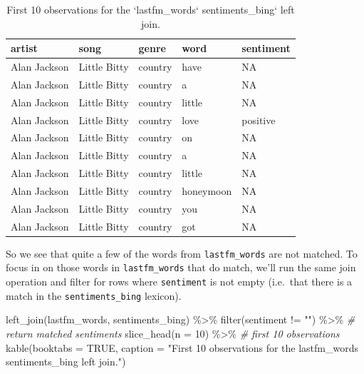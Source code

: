 \documentclass[
]{article}
\newenvironment{Shaded}{\begin{snugshade}}{\end{snugshade}}
\newcommand{\AttributeTok}[1]{\textcolor[rgb]{0.77,0.63,0.00}{#1}}
\newcommand{\CommentTok}[1]{\textcolor[rgb]{0.56,0.35,0.01}{\textit{#1}}}
\newcommand{\ConstantTok}[1]{\textcolor[rgb]{0.00,0.00,0.00}{#1}}
\newcommand{\DecValTok}[1]{\textcolor[rgb]{0.00,0.00,0.81}{#1}}
\newcommand{\FunctionTok}[1]{\textcolor[rgb]{0.00,0.00,0.00}{#1}}
\newcommand{\NormalTok}[1]{#1}
\newcommand{\SpecialCharTok}[1]{\textcolor[rgb]{0.00,0.00,0.00}{#1}}
\newcommand{\StringTok}[1]{\textcolor[rgb]{0.31,0.60,0.02}{#1}}
\begin{document}
\begin{table}

\caption{\label{tab:td-lastfm-words-bing-left-joing}First 10 observations for the `lastfm_words` sentiments_bing` left join.}
\centering
\begin{tabular}[t]{lllll}
\toprule
artist & song & genre & word & sentiment\\
\midrule
Alan Jackson & Little Bitty & country & have & NA\\
Alan Jackson & Little Bitty & country & a & NA\\
Alan Jackson & Little Bitty & country & little & NA\\
Alan Jackson & Little Bitty & country & love & positive\\
Alan Jackson & Little Bitty & country & on & NA\\
\addlinespace
Alan Jackson & Little Bitty & country & a & NA\\
Alan Jackson & Little Bitty & country & little & NA\\
Alan Jackson & Little Bitty & country & honeymoon & NA\\
Alan Jackson & Little Bitty & country & you & NA\\
Alan Jackson & Little Bitty & country & got & NA\\
\bottomrule
\end{tabular}
\end{table}

So we see that quite a few of the words from \texttt{lastfm\_words} are not matched. To focus in on those words in \texttt{lastfm\_words} that do match, we'll run the same join operation and filter for rows where \texttt{sentiment} is not empty (i.e.~that there is a match in the \texttt{sentiments\_bing} lexicon).

\begin{Shaded}
\begin{Highlighting}[]
\FunctionTok{left\_join}\NormalTok{(lastfm\_words, sentiments\_bing) }\SpecialCharTok{\%\textgreater{}\%}
  \FunctionTok{filter}\NormalTok{(sentiment }\SpecialCharTok{!=} \StringTok{""}\NormalTok{) }\SpecialCharTok{\%\textgreater{}\%} \CommentTok{\# return matched sentiments}
  \FunctionTok{slice\_head}\NormalTok{(}\AttributeTok{n =} \DecValTok{10}\NormalTok{) }\SpecialCharTok{\%\textgreater{}\%} \CommentTok{\# first 10 observations}
  \FunctionTok{kable}\NormalTok{(}\AttributeTok{booktabs =} \ConstantTok{TRUE}\NormalTok{,}
        \AttributeTok{caption =} \StringTok{"First 10 observations for the \textasciigrave{}lastfm\_words\textasciigrave{} sentiments\_bing\textasciigrave{} left join."}\NormalTok{)}
\end{Highlighting}
\end{Shaded}
\end{document}
